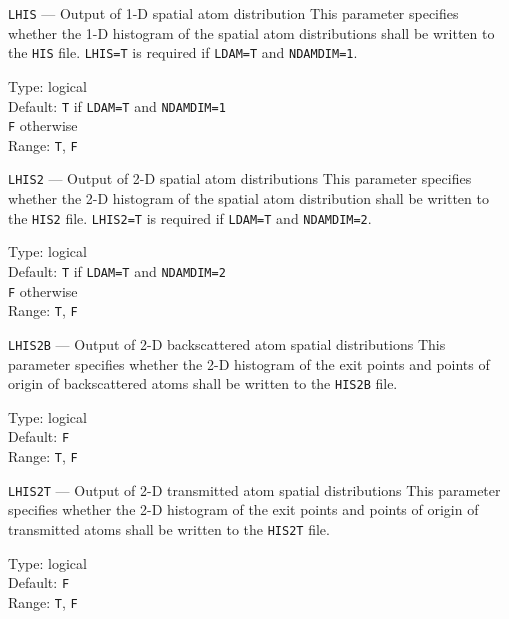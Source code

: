 \begin{keydescription}{\texttt{LHIS} --- Output of 1-D spatial atom distribution}
%
  This parameter specifies whether the 1-D histogram of the spatial atom distributions shall be 
  written to the \texttt{HIS} file. \texttt{LHIS=T} is required if
  \texttt{LDAM=T} and \texttt{NDAMDIM=1}.
  \begin{keytab}
    Type:    \> logical \\
    Default: \> \texttt{T} if \texttt{LDAM=T} and \texttt{NDAMDIM=1} \\
             \> \texttt{F} otherwise \\
    Range:   \> \texttt{T}, \texttt{F} 
  \end{keytab}
\end{keydescription}

\begin{keydescription}{\texttt{LHIS2} --- Output of 2-D spatial atom distributions}
%
  This parameter specifies whether the 2-D histogram of the spatial atom distribution shall be 
  written to the \texttt{HIS2} file. \texttt{LHIS2=T} is required if
  \texttt{LDAM=T} and \texttt{NDAMDIM=2}.
  \begin{keytab}
    Type:    \> logical \\
    Default: \> \texttt{T} if \texttt{LDAM=T} and \texttt{NDAMDIM=2} \\
             \> \texttt{F} otherwise \\
    Range:   \> \texttt{T}, \texttt{F} 
  \end{keytab}
\end{keydescription}

\begin{keydescription}{\texttt{LHIS2B} --- Output of 2-D backscattered atom spatial distributions}
%
  This parameter specifies whether the 2-D histogram of the exit points
  and points of origin of backscattered atoms shall be written to
  the \texttt{HIS2B} file.
  \begin{keytab}
    Type:    \> logical \\
    Default: \> \texttt{F} \\
    Range:   \> \texttt{T}, \texttt{F} 
  \end{keytab}
\end{keydescription}

\begin{keydescription}{\texttt{LHIS2T} --- Output of 2-D transmitted atom spatial distributions}
%
  This parameter specifies whether the 2-D histogram of the exit points
  and points of origin of transmitted atoms shall be written to
  the \texttt{HIS2T} file.
  \begin{keytab}
    Type:    \> logical \\
    Default: \> \texttt{F} \\
    Range:   \> \texttt{T}, \texttt{F} 
  \end{keytab}
\end{keydescription}

